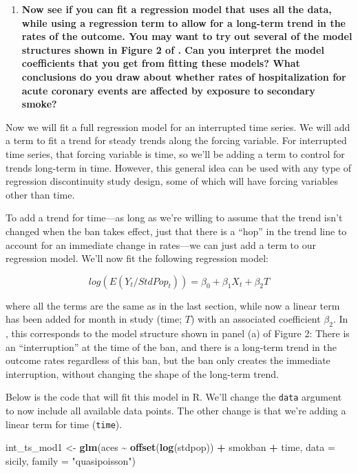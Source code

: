 \documentclass[
]{book}
\newenvironment{Shaded}{\begin{snugshade}}{\end{snugshade}}
\newcommand{\AttributeTok}[1]{\textcolor[rgb]{0.13,0.29,0.53}{#1}}
\newcommand{\FunctionTok}[1]{\textcolor[rgb]{0.13,0.29,0.53}{\textbf{#1}}}
\newcommand{\NormalTok}[1]{#1}
\newcommand{\OtherTok}[1]{\textcolor[rgb]{0.56,0.35,0.01}{#1}}
\newcommand{\SpecialCharTok}[1]{\textcolor[rgb]{0.81,0.36,0.00}{\textbf{#1}}}
\newcommand{\StringTok}[1]{\textcolor[rgb]{0.31,0.60,0.02}{#1}}
\providecommand{\tightlist}{%
  \setlength{\itemsep}{0pt}\setlength{\parskip}{0pt}}
\begin{document}
\begin{enumerate}
\def\labelenumi{\arabic{enumi}.}
\setcounter{enumi}{2}
\tightlist
\item
  \textbf{Now see if you can fit a regression model that uses all the data, while using a regression term to allow for a long-term trend in the rates of the outcome. You may want to try out several of the model structures shown in Figure 2 of \citet{bernal2017interrupted}. Can you interpret the model coefficients that you get from fitting these models? What conclusions do you draw about whether rates of hospitalization for acute coronary events are affected by exposure to secondary smoke?}
\end{enumerate}

Now we will fit a full regression model for an interrupted time series. We will add a term to fit a trend for steady trends along the forcing variable. For interrupted time series, that forcing variable is time, so we'll be adding a term to control for trends long-term in time. However, this general idea can be used with any type of regression discontinuity study design, some of which will have forcing variables other than time.

To add a trend for time---as long as we're willing to assume that the trend isn't changed when the ban takes effect, just that there is a ``hop'' in the trend line to account for an immediate change in rates---we can just add a term to our regression model. We'll now fit the following regression model:

\[
log(E(Y_t/StdPop_t)) = \beta_0 + \beta_1 X_t + \beta_2 T
\]

where all the terms are the same as in the last section, while now a linear term has been added for month in study (time; \(T\)) with an associated coefficient \(\beta_2\). In \citet{bernal2017interrupted}, this corresponds to the model structure shown in panel (a) of Figure 2: There is an ``interruption'' at the time of the ban, and there is a long-term trend in the outcome rates regardless of this ban, but the ban only creates the immediate interruption, without changing the shape of the long-term trend.

Below is the code that will fit this model in R. We'll change the \texttt{data} argument to now include all available data points. The other change is that we're adding a linear term for time (\texttt{time}).

\begin{Shaded}
\begin{Highlighting}[]
\NormalTok{int\_ts\_mod1 }\OtherTok{\textless{}{-}} \FunctionTok{glm}\NormalTok{(aces }\SpecialCharTok{\textasciitilde{}} \FunctionTok{offset}\NormalTok{(}\FunctionTok{log}\NormalTok{(stdpop)) }\SpecialCharTok{+}\NormalTok{ smokban }\SpecialCharTok{+}\NormalTok{ time, }
                      \AttributeTok{data =}\NormalTok{ sicily, }
                      \AttributeTok{family =} \StringTok{"quasipoisson"}\NormalTok{)}
\end{Highlighting}
\end{Shaded}
\end{document}
